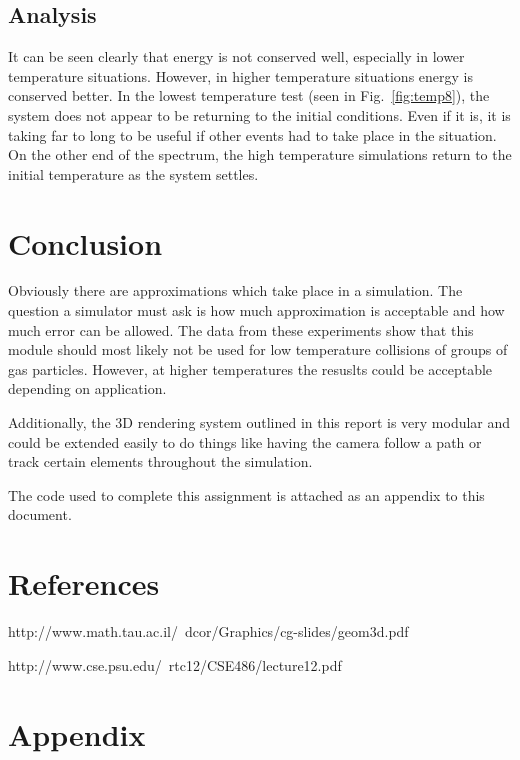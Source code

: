 \documentclass{article}
\begin{document}

\subsection{Analysis}
It can be seen clearly that energy is not conserved well, especially in lower temperature situations. However, in 
higher temperature situations energy is conserved better. In the lowest temperature test 
(seen in Fig.~\ref{fig:temp8}), the system does not appear
to be returning to the initial conditions. Even if it is, it is taking far to long to be useful if other events
had to take place in the situation. On the other end of the spectrum, the high temperature simulations return to 
the initial temperature as the system settles.


\section{Conclusion}
Obviously there are approximations which take place in a simulation. The question a simulator must ask is how
much approximation is acceptable and how much error can be allowed. The data from these experiments show that this
module should most likely not be used for low temperature collisions of groups of gas particles. However, at higher
temperatures the resuslts could be acceptable depending on application.

Additionally, the 3D rendering system outlined in this report is very modular and could be extended easily to 
do things like having the camera follow a path or track certain elements throughout the simulation.

The code used to complete this assignment is attached as an appendix to this document.

\section{References}
http://www.math.tau.ac.il/~dcor/Graphics/cg-slides/geom3d.pdf

http://www.cse.psu.edu/~rtc12/CSE486/lecture12.pdf

\newpage
\onecolumn
\section{Appendix}

\end{document}

